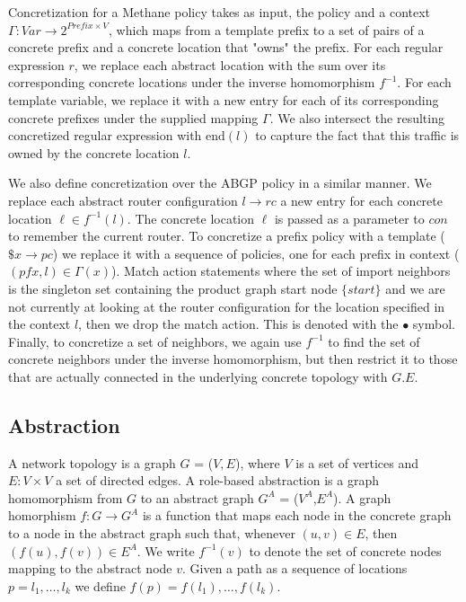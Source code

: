 \documentclass[twocolumn, openany]{sig-alternate-10pt}
\newcommand{\sysname}{{\small \sf Methane}\xspace}
\begin{document}
Concretization for a \sysname policy takes as input, the policy and a context
$\Gamma : Var \rightarrow 2^{Prefix \times V}$,
which maps from a template prefix to a set of pairs of a concrete prefix and a concrete location that "owns" the prefix.
%
For each regular expression $r$, we replace each abstract location with the sum over its corresponding concrete locations under the inverse homomorphism $f^{-1}$. For each template variable, we replace it with a new entry for each of its corresponding concrete prefixes under the supplied mapping $\Gamma$. We also intersect the resulting concretized regular expression with $\text{end}(l)$ to capture the fact that this traffic is owned by the concrete location $l$.%

We also define concretization over the ABGP policy in a similar manner. We replace each abstract router configuration $l \rightarrow rc$ a new entry for each concrete location $\ell \in f^{-1}(l)$. The concrete location $\ell$ is passed as a parameter to $con$ to remember the current router.
%
To concretize a prefix policy with a template ($\$x \rightarrow pc$) we replace it with a sequence of policies, one for each prefix in context ($(pfx,l) \in \Gamma(x)$). Match action statements where the set of import neighbors is the singleton set containing the product graph start node $\{ start \}$ and we are not currently at looking at the router configuration for the location specified in the context $l$, then we drop the match action. This is denoted with the $\bullet$ symbol. Finally, to concretize a set of neighbors, we again use $f^{-1}$ to find the set of concrete neighbors under the inverse homomorphism, but then restrict it to those that are actually connected in the underlying concrete topology with $G.E$.



\subsection{Abstraction}

A network topology is a graph $G$ = ($V, E$), where $V$ is a set of vertices and $E \colon V \times V$ a set of directed edges. A role-based abstraction is a graph homomorphism from $G$ to an abstract graph $G^A$ = ($V^A$,$E^A$). A graph homorphism $f : G \rightarrow G^A$ is a function that maps each node in the concrete graph to a node in the abstract graph such that, whenever $(u,v) \in E$, then $(f(u),f(v)) \in E^A$. We write $f^{-1}(v)$ to denote the set of concrete nodes mapping to the abstract node $v$. Given a path as a sequence of locations $p = l_1, \dots, l_k$ we define $f(p) = f(l_1), \dots, f(l_k)$.
\end{document}
